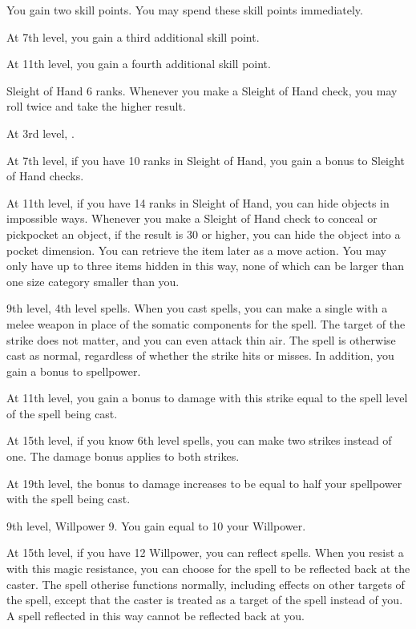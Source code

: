     \featben You gain two skill points.
    You may spend these skill points immediately.

    At 7th level, you gain a third additional skill point.

    At 11th level, you gain a fourth additional skill point.

    \featpre Sleight of Hand 6 ranks.
    \featben Whenever you make a Sleight of Hand check, you may roll twice and take the higher result.

    At 3rd level, \tdash.

    At 7th level, if you have 10 ranks in Sleight of Hand, you gain a  bonus to Sleight of Hand checks.

    At 11th level, if you have 14 ranks in Sleight of Hand, you can hide objects in impossible ways.
    Whenever you make a Sleight of Hand check to conceal or pickpocket an object, if the result is 30 or higher, you can hide the object into a pocket dimension.
    You can retrieve the item later as a move action.
    You may only have up to three items hidden in this way, none of which can be larger than one size category smaller than you.
    \magical

    \featpres 9th level, 4th level spells.
    \featben When you cast spells, you can make a single  with a melee weapon in place of the somatic components for the spell.
    The target of the strike does not matter, and you can even attack thin air.
    The spell is otherwise cast as normal, regardless of whether the strike hits or misses.
    In addition, you gain a  bonus to spellpower.

    At 11th level, you gain a bonus to damage with this strike equal to the spell level of the spell being cast.

    At 15th level, if you know 6th level spells, you can make two strikes instead of one.
    The damage bonus applies to both strikes.

    At 19th level, the bonus to damage increases to be equal to half your spellpower with the spell being cast.

    \featpres 9th level, Willpower 9.
    \featben You gain  equal to 10 \add your Willpower.

    At 15th level, if you have 12 Willpower, you can reflect spells.
    When you resist a  with this magic resistance, you can choose for the spell to be reflected back at the caster.
    The spell otherise functions normally, including effects on other targets of the spell, except that the caster is treated as a target of the spell instead of you.
    A spell reflected in this way cannot be reflected back at you.

